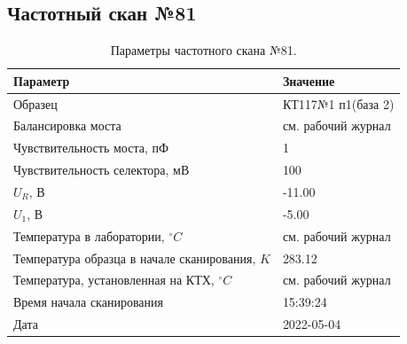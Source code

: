 \subsection{Частотный скан №81}
\begin{table}[!ht]
    \centering
    \caption{Параметры частотного скана №81.}
    \begin{tabular}{|l|l|}
        \hline
        Параметр                                       & Значение                  \\ \hline
        Образец                                        & КТ117№1 п1(база 2)        \\ \hline
        Балансировка моста                             & см. рабочий журнал        \\ \hline
        Чувствительность моста, пФ                     & 1                         \\ \hline
        Чувствительность селектора, мВ                 & 100                       \\ \hline
        $U_R$, В                                       & -11.00                    \\ \hline
        $U_1$, В                                       & -5.00                     \\ \hline
        Температура в лаборатории, $^\circ C$          & см. рабочий журнал        \\ \hline
        Температура образца в начале сканирования, $K$ & 283.12                    \\ \hline
        Температура, установленная на КТХ, $^\circ C$  & см. рабочий журнал        \\ \hline
        Время начала сканирования                      & 15:39:24                  \\ \hline
        Дата                                           & 2022-05-04                \\ \hline
    \end{tabular}
    \label{table:frequency_scan_81}
\end{table}

